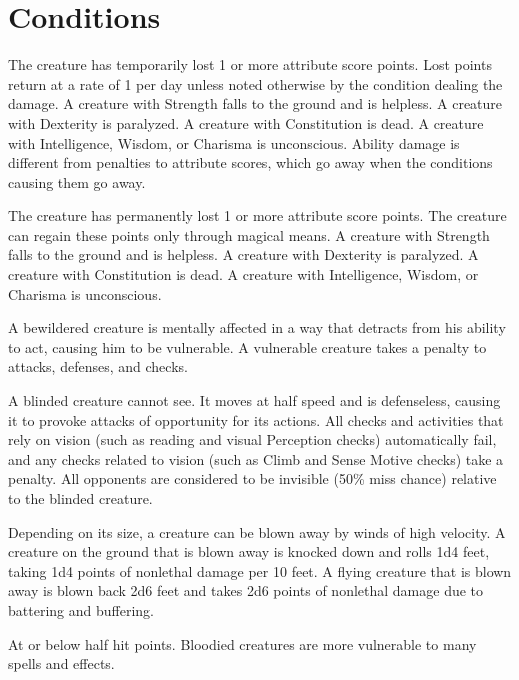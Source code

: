 \appendix
\chapter{Conditions}

 The creature has temporarily lost 1 or more attribute score points. Lost points return at a rate of 1 per day unless noted otherwise by the condition dealing the damage. A creature with Strength  falls to the ground and is helpless. A creature with Dexterity  is paralyzed. A creature with Constitution  is dead. A creature with Intelligence, Wisdom, or Charisma  is unconscious. Ability damage is different from penalties to attribute scores, which go away when the conditions causing them go away.

 The creature has permanently lost 1 or more attribute score points. The creature can regain these points only through magical means. A creature with Strength  falls to the ground and is helpless. A creature with Dexterity  is paralyzed. A creature with Constitution  is dead. A creature with Intelligence, Wisdom, or Charisma  is unconscious.

 A bewildered creature is mentally affected in a way that detracts from his ability to act, causing him to be vulnerable. A vulnerable creature takes a  penalty to attacks, defenses, and checks.

 A blinded creature cannot see. It moves at half speed and is defenseless, causing it to provoke attacks of opportunity for its actions. All checks and activities that rely on vision (such as reading and visual Perception checks) automatically fail, and any checks related to vision (such as Climb and Sense Motive checks) take a  penalty. All opponents are considered to be invisible (50\% miss chance) relative to the blinded creature.

 Depending on its size, a creature can be blown away by winds of high velocity. A creature on the ground that is blown away is knocked down and rolls 1d4  feet, taking 1d4 points of nonlethal damage per 10 feet. A flying creature that is blown away is blown back 2d6  feet and takes 2d6 points of nonlethal damage due to battering and buffering.

 At or below half hit points. Bloodied creatures are more vulnerable to many spells and effects.

